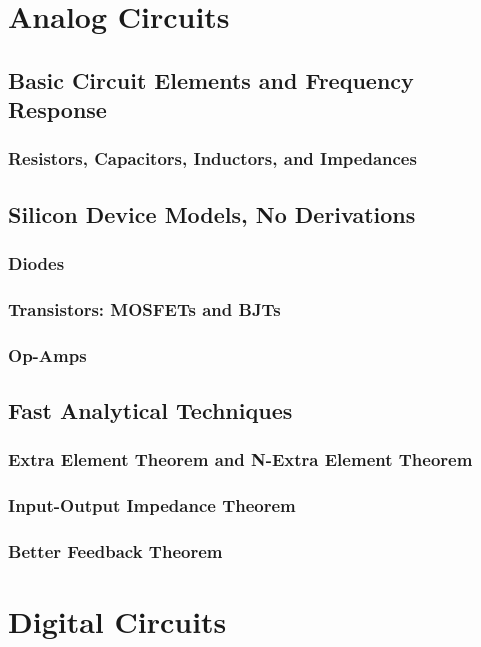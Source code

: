 \documentclass[12pt]{report}
\begin{document}

\newpage
\tableofcontents
\newpage
\chapter{Analog Circuits}
\section{Basic Circuit Elements and Frequency Response}
\subsection{Resistors, Capacitors, Inductors, and Impedances}
\section{Silicon Device Models, No Derivations}
\subsection{Diodes}
\subsection{Transistors: MOSFETs and BJTs}
\subsection{Op-Amps}
\section{Fast Analytical Techniques}
\subsection{Extra Element Theorem and N-Extra Element Theorem}
\subsection{Input-Output Impedance Theorem}
\subsection{Better Feedback Theorem}

\newpage
\chapter{Digital Circuits}
\end{document}
